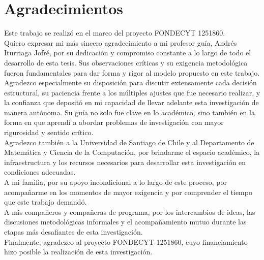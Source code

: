 \chapter*{Agradecimientos}

Este trabajo se realizó en el marco del proyecto FONDECYT 1251860. \\

Quiero expresar mi más sincero agradecimiento a mi profesor guía, Andrés Iturriaga Jofré, por su dedicación y compromiso constante a lo largo de todo el desarrollo de esta tesis. Sus observaciones críticas y su exigencia metodológica fueron fundamentales para dar forma y rigor al modelo propuesto en este trabajo. Agradezco especialmente su disposición para discutir extensamente cada decisión estructural, su paciencia frente a los múltiples ajustes que fue necesario realizar, y la confianza que depositó en mi capacidad de llevar adelante esta investigación de manera autónoma. Su guía no solo fue clave en lo académico, sino también en la forma en que aprendí a abordar problemas de investigación con mayor rigurosidad y sentido crítico. \\

Agradezco también a la Universidad de Santiago de Chile y al Departamento de Matemática y Ciencia de la Computación, por brindarme el espacio académico, la infraestructura y los recursos necesarios para desarrollar esta investigación en condiciones adecuadas. \\

A mi familia, por su apoyo incondicional a lo largo de este proceso, por acompañarme en los momentos de mayor exigencia y por comprender el tiempo que este trabajo demandó. \\

A mis compañeros y compañeras de programa, por los intercambios de ideas, las discusiones metodológicas informales y el acompañamiento mutuo durante las etapas más desafiantes de esta investigación. \\

Finalmente, agradezco al proyecto FONDECYT 1251860, cuyo financiamiento hizo posible la realización de esta investigación. \\